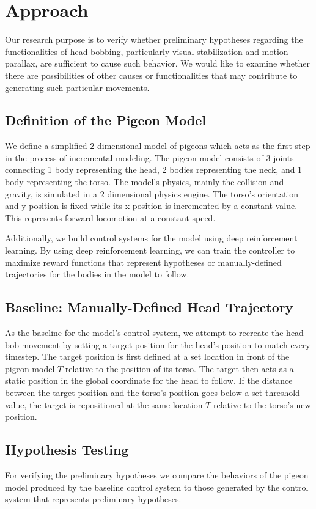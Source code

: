 \chapter{Approach} \label{ch:approach}
Our research purpose is to verify whether preliminary hypotheses regarding the functionalities of head-bobbing, particularly visual stabilization and motion parallax, are sufficient to cause such behavior. We would like to examine whether there are possibilities of other causes or functionalities that may contribute to generating such particular movements.

\section{Definition of the Pigeon Model}
  We define a simplified 2-dimensional model of pigeons which acts as the first step in the process of incremental modeling. The pigeon model consists of 3 joints connecting 1 body representing the head, 2 bodies representing the neck, and 1 body representing the torso. The model's physics, mainly the collision and gravity, is simulated in a 2 dimensional physics engine. The torso's orientation and y-position is fixed while its x-position is incremented by a constant value. This represents forward locomotion at a constant speed.

  Additionally, we build control systems for the model using deep reinforcement learning. By using deep reinforcement learning, we can train the controller to maximize reward functions that represent hypotheses or manually-defined trajectories for the bodies in the model to follow.

\section{Baseline: Manually-Defined Head Trajectory}
  As the baseline for the model's control system, we attempt to recreate the head-bob movement by setting a target position for the head's position to match every timestep. The target position is first defined at a set location in front of the pigeon model $T$ relative to the position of its torso. The target then acts as a static position in the global coordinate for the head to follow. If the distance between the target position and the torso's position goes below a set threshold value, the target is repositioned at the same location $T$ relative to the torso's new position.

\section{Hypothesis Testing}
  For verifying the preliminary hypotheses we compare the behaviors of the pigeon model produced by the baseline control system to those generated by the control system that represents preliminary hypotheses.

